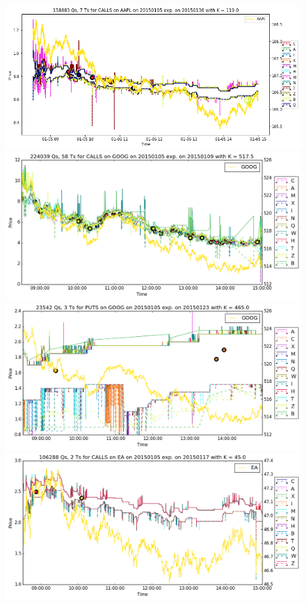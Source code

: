 \documentclass[a4paper,12pt]{article}
\theoremstyle{plain}
\theoremstyle{definition}
\begin{document}
\begin{figure}[H]
\begin{center}
 \includegraphics[width=\linewidth]{figures/contract_pics/AAPL_middle.png}
 \endminipage\\
 \vspace{5mm}
 \includegraphics[width=\linewidth]{figures/contract_pics/GOOG_top.png}
 \endminipage
 \hspace{3mm}
 \includegraphics[width=\linewidth]{figures/contract_pics/GOOG_middle.png}
 \endminipage\\
 \vspace{5mm}
 \includegraphics[width=\linewidth]{figures/contract_pics/EA_top.png}

\end{center}
\end{figure}
\end{document}
